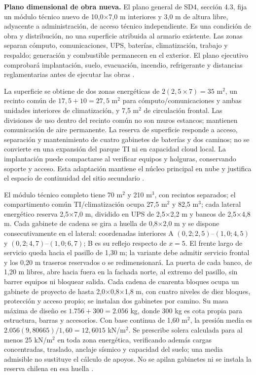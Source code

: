 \textbf{Plano dimensional de obra nueva.} El plano general de SD4, sección 4.3, fija un módulo técnico nuevo de 10,0$\times$7,0 m interiores y 3,0 m de altura libre, adyacente a administración, de acceso técnico independiente. Es una condición de obra y distribución, no una superficie atribuida al armario existente. Las zonas separan cómputo, comunicaciones, UPS, baterías, climatización, trabajo y respaldo; generación y combustible permanecen en el exterior. El plano ejecutivo comprobará implantación, suelo, evacuación, incendio, refrigerante y distancias reglamentarias antes de ejecutar las obras \parencite[RT-06.01/03/06, pp.~14--15]{pucv-transversal}.



La superficie se obtiene de dos zonas energéticas de $2(2,5\times7)=35$ m$^2$, un recinto común de $17,5+10=27,5$ m$^2$ para cómputo/comunicaciones y ambas unidades interiores de climatización, y 7,5 m$^2$ de circulación frontal. Las divisiones de uso dentro del recinto común no son muros estancos; mantienen comunicación de aire permanente. La reserva de superficie responde a acceso, separación y mantenimiento de cuatro gabinetes de baterías y dos caminos; no se convierte en una expansión del parque TI ni en capacidad cloud local. La implantación puede compactarse al verificar equipos y holguras, conservando soporte y acceso. Esta adaptación mantiene el núcleo principal en nube y justifica el espacio de continuidad del sitio secundario \parencites[secc.~6.1, p.~14; RT-15.01, p.~27]{pucv-transversal}[cap.~15, RT-06.01]{caso07}.

El módulo técnico completo tiene 70 m$^2$ y 210 m$^3$, con recintos separados; el compartimento común TI/climatización ocupa 27,5 m$^2$ y 82,5 m$^3$; cada lateral energético reserva 2,5$\times$7,0 m, dividido en UPS de 2,5$\times$2,2 m y bancos de 2,5$\times$4,8 m. Cada gabinete de cadena se gira a huella de 0,8$\times$2,0 m y se dispone consecutivamente en el lateral: coordenadas interiores A $(0,2;2,5)$--$(1,0;4,5)$ y $(0,2;4,7)$--$(1,0;6,7)$; B es su reflejo respecto de $x=5$. El frente largo de servicio queda hacia el pasillo de 1,30 m; la variante debe admitir servicio frontal y los 0,20 m traseros reservados o se redimensionará. La puerta de cada banco, de 1,20 m libres, abre hacia fuera en la fachada norte, al extremo del pasillo, sin barrer equipos ni bloquear salida. Cada cadena de cuarenta bloques ocupa un gabinete de proyecto de hasta 2,0$\times$0,8$\times$1,8 m, con cuatro niveles de diez bloques, protección y acceso propio; se instalan dos gabinetes por camino. Su masa máxima de diseño es $1.756+300=2.056$ kg, donde 300 kg es cota propia para estructura, barras y accesorios. Con base continua de 1,60 m$^2$, la presión media es $2.056(9,80665)/1,60=12,6015$ kN/m$^2$. Se prescribe solera calculada para al menos 25 kN/m$^2$ en toda zona energética, verificando además cargas concentradas, traslado, anclaje sísmico y capacidad del suelo; una media admisible no sustituye el cálculo de apoyos. No se apilan gabinetes ni se instala la reserva chilena en esa huella \parencite[p.~1]{csbHRL12540WRA260131}.

